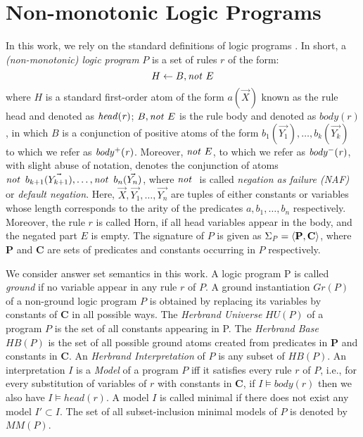 \section{Non-monotonic Logic Programs}
\label{sec:non-prog}
In this work, we rely on the standard definitions of logic programs \cite{DBLP:books/sp/Lloyd87}.
In short, a \emph{(non-monotonic) logic program} $P$ is a set of rules $r$ of the form:
\begin{equation}
H\leftarrow B, \mathit{not}~ E
\end{equation}
\noindent where $H$ is a standard first-order atom of the form $a(\vec{X})$ known as the rule head and denoted as $\mathit{head(r)}$; $B, \mathit{not}~ E$ is the rule body and denoted as $body(r)$, in which $B$ is a conjunction of positive atoms of the form $b_1(\vec{Y_1}),\dotsc,b_k(\vec{Y_k})$ to which we refer as $\mathit{body^+(r)}$. Moreover, $\mathit{not}~ E$, to which we refer as $\mathit{body^-(r)}$, with slight abuse of notation, denotes the conjunction of atoms $\mathit{not}~ \, b_{k+1}(\vec{Y_{k+1}}),\dotsc,\mathit{not}~ \, b_n(\vec{Y_{n}})$, where $\naf$ is called \emph{negation as failure (NAF)} or \emph{default negation}.
Here, $\vec{X},\vec{Y_1},\ldots,\vec{Y_{n}}$ are tuples of either constants or
variables whose length corresponds to the arity of the predicates
$a,b_1,\ldots,b_n$ respectively. Moreover, the rule $r$ is called Horn, if all head variables appear in the body, and the negated part $E$ is empty. The signature of $P$ is given as $\Sigma_{\mathit{P}}=\langle\mathbf{P},\mathbf{C}\rangle$, where $\mathbf{P}$ and $\mathbf{C}$ are sets of predicates and constants occurring in $P$ respectively.  %

We consider answer set semantics \cite{GL1988} in this work. A logic program P is called \textit{ground} if no variable appear in any rule $r$ of $P$. A ground instantiation $Gr(P)$ of a non-ground logic program $P$ is obtained by replacing its variables by constants of $\mathbf{C}$ in all
possible ways. The \textit{Herbrand Universe} $HU(P)$ of a program $P$ is the set of all constants appearing in P. The \textit{Herbrand Base} $HB(P)$ is the set of all possible ground atoms created from predicates in $\mathbf{P}$ and constants in $\mathbf{C}$. An \textit{Herbrand Interpretation} of $P$ is any subset of $HB(P)$. An interpretation $I$ is a \textit{Model} of a program $P$ iff it satisfies every rule $r$ of $P$, i.e., for every substitution  of variables of $r$ with constants in $\mathbf{C}$, if $I \models body(r)$ then we also have $I \models head(r)$. A model $I$ is called minimal if there does not exist any model $I' \subset I$. The set of all subset-inclusion minimal models of $P$ is denoted by $MM(P)$.

